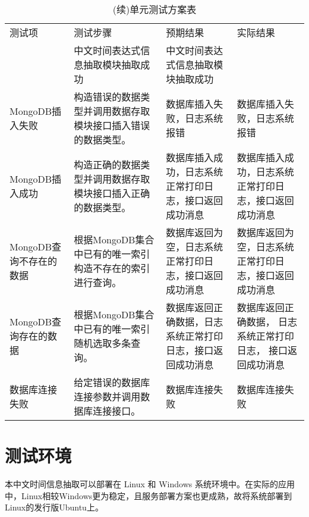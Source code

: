 \begin{table}[h]
    \centering
    \caption{(续)单元测试方案表}
    \begin{tabularx}{\linewidth}{|Y|Y|Y|Y|}
        \hline
        测试项                  & 测试步骤                                                     & 预期结果                                                   & 实际结果                                                     \\                                            & 中文时间表达式信息抽取模块抽取成功                         & 中文时间表达式信息抽取模块抽取成功                           \\
        \hline
        MongoDB插入失败         & 构造错误的数据类型并调用数据存取模块接口插入错误的数据类型。 & 数据库插入失败，日志系统报错                               & 数据库插入失败，日志系统报错                                 \\
        \hline
        MongoDB插入成功         & 构造正确的数据类型并调用数据存取模块接口插入正确的数据类型。 & 数据库插入成功，日志系统正常打印日志，接口返回成功消息     & 数据库插入成功，日志系统正常打印日志，接口返回成功消息       \\
        \hline
        MongoDB查询不存在的数据 & 根据MongoDB集合中已有的唯一索引构造不存在的索引进行查询。    & 数据库返回为空，日志系统正常打印日志，接口返回成功消息     & 数据库返回为空，日志系统正常打印日志，接口返回成功消息       \\
        \hline
        MongoDB查询存在的数据   & 根据MongoDB集合中已有的唯一索引随机选取多条查询。            & 数据库返回正确数据，日志系统正常打印日志，接口返回成功消息 & 数据库返回正确数据， 日志系统正常打印日志， 接口返回成功消息 \\
        \hline
        数据库连接失败          & 给定错误的数据库连接参数并调用数据库连接接口。               & 数据库连接失败                                             & 数据库连接失败                                               \\
        \hline
    \end{tabularx}
    \label{tab:unit_test}
\end{table}


\section{测试环境}

本中文时间信息抽取可以部署在 Linux 和 Windows 系统环境中。在实际的应用中，Linux相较Windows更为稳定，且服务部署方案也更成熟，故将系统部署到Linux的发行版Ubuntu上。


